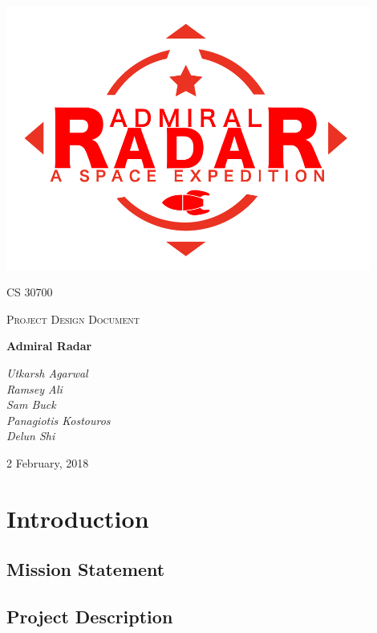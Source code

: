 \documentclass[12pt]{article}
\begin{document}
\begin{titlepage}
	\centering
	\includegraphics[width=0.9\textwidth]{logo}\par\vspace{1cm}
	{\scshape\LARGE CS 30700 \par}
	{\scshape\Large Project Design Document\par}
	\vspace{1.5cm}
	{\Huge\bfseries Admiral Radar\par}
	\vspace{1.5cm}
	{\large\itshape Utkarsh Agarwal\\ Ramsey Ali \\ Sam Buck \\ Panagiotis Kostouros \\ Delun Shi \par}

	\vfill
	{\large 2 February, 2018 \par}
\end{titlepage}

\tableofcontents

\pagebreak

\section{Introduction}

\subsection{Mission Statement}


\subsection{Project Description}

\end{document}
